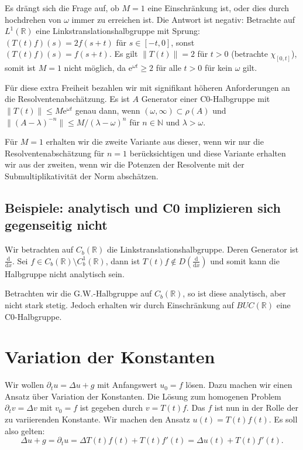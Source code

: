 \documentclass[11pt,a4paper]{scrartcl}
\newcommand{\N}{\mathbb{N}} %
\newcommand{\R}{\mathbb{R}} %
\theoremstyle{plain}
\theoremstyle{definition}
\theoremstyle{remark}
\begin{document}
Es drängt sich die Frage auf, ob $M=1$ eine Einschränkung ist, oder dies durch hochdrehen von $\omega$ immer zu erreichen ist. Die Antwort ist negativ: Betrachte auf $L^1(\R)$ eine Linkstranslationshalbgruppe mit Sprung: $(T(t)f)(s) = 2f(s+t)$ für $s\in [-t,0]$, sonst $(T(t)f)(s)=f(s+t)$. Es gilt $\|T(t)\|=2$ für $t>0$ (betrachte $\chi_{[0,t]}$), somit ist $M=1$ nicht möglich, da $\mathrm{e}^{\omega t} \geq 2$ für alle $t>0$ für kein $\omega$ gilt.

Für diese extra Freiheit bezahlen wir mit signifikant höheren Anforderungen an die Resolventenabschätzung. Es ist $A$ Generator einer C0-Halbgruppe mit $\|T(t)\|\leq M \mathrm{e}^{\omega t}$ genau dann, wenn $(\omega, \infty)\subset \rho(A)$ und $\|(A-\lambda)^{-n}\| \leq M/(\lambda-\omega)^n$ für $n\in \N$ und $\lambda > \omega$.

Für $M=1$ erhalten wir die zweite Variante aus dieser, wenn wir nur die Resolventenabschätzung für $n=1$ berücksichtigen und diese Variante erhalten wir aus der zweiten, wenn wir die Potenzen der Resolvente mit der Submultiplikativität der Norm abschätzen.

\subsection{Beispiele: analytisch und C0 implizieren sich gegenseitig nicht}

Wir betrachten auf $C_b(\R)$ die Linkstranslationshalbgruppe. Deren Generator ist $\frac{\mathrm{d}}{\mathrm{d}x}$. Sei $f\in C_b(\R) \setminus C_b^1(\R)$, dann ist $T(t)f \not\in D(\frac{\mathrm{d}}{\mathrm{d}x})$ und somit kann die Halbgruppe nicht analytisch sein.

Betrachten wir die G.W.-Halbgruppe auf $C_b(\R)$, so ist diese analytisch, aber nicht stark stetig. Jedoch erhalten wir durch Einschränkung auf $BUC(\R)$ eine C0-Halbgruppe.



\section{Variation der Konstanten}

Wir wollen $\partial_t u = \Delta u + g$ mit Anfangswert $u_0=f$ lösen. Dazu machen wir einen Ansatz über Variation der Konstanten. Die Lösung zum homogenen Problem $\partial_t v = \Delta v$ mit $v_0=f$ ist gegeben durch $v=T(t)f$. Das $f$ ist nun in der Rolle der zu variierenden Konstante. Wir machen den Ansatz $u(t)=T(t)f(t)$. Es soll also gelten: $$\Delta u + g = \partial_t u = \Delta T(t)f(t) + T(t)f'(t) = \Delta u(t) + T(t)f'(t).$$
\end{document}

